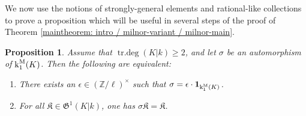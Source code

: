 \documentclass[11pt]{amsart}
\newtheorem{proposition}{Proposition}[section]
\theoremstyle{definition}
\theoremstyle{remark}
\numberwithin{equation}{section}
\DeclareMathOperator{\trdeg}{tr.deg}
\newcommand{\Z}{\mathbb{Z}}
\newcommand{\Kfrak}{\mathfrak{K}}
\newcommand{\Gfrak}{\mathfrak{G}}
\renewcommand{\k}{\operatorname{k}^{\rm M}}
\newcommand{\one}{\mathbf{1}}
\begin{document}
We now use the notions of strongly-general elements and rational-like collections to prove a proposition which will be useful in several steps of the proof of Theorem \ref{maintheorem: intro / milnor-variant / milnor-main}.

\begin{proposition}
\label{proposition: strgen / rational-like / ident-criterion}
  Assume that $\trdeg(K|k) \geq 2$, and let $\sigma$ be an automorphism of $\k_1(K)$.
  Then the following are equivalent:
  \begin{enumerate}
    \item There exists an $\epsilon \in (\Z/\ell)^\times$ such that $\sigma = \epsilon \cdot \one_{\k_1(K)}$.
    \item For all $\Kfrak \in \Gfrak^1(K|k)$, one has $\sigma \Kfrak = \Kfrak$.
  \end{enumerate}
\end{proposition}
\end{document}
